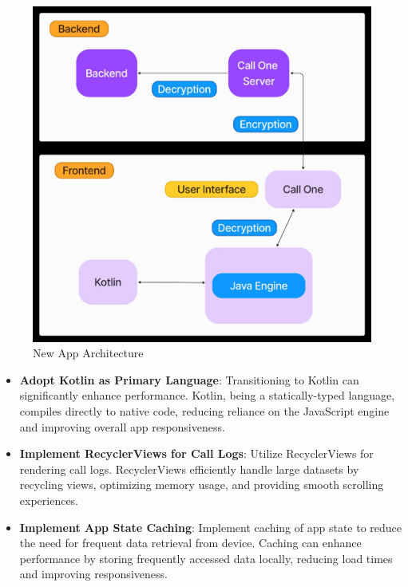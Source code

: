 \begin{figure}
    \centering
    \includegraphics[width=1\linewidth]{Media//Chapter 4//app_arch}
    \caption{New App Architecture}
    \label{fig:New App Architecture}
\end{figure}

\begin{itemize}
    \item \textbf{Adopt Kotlin as Primary Language}: Transitioning to Kotlin can significantly enhance performance.
    Kotlin, being a statically-typed language, compiles directly to native code, reducing reliance on the JavaScript engine and improving overall app responsiveness.

    \item \textbf{Implement RecyclerViews for Call Logs}: Utilize RecyclerViews for rendering call logs.
    RecyclerViews efficiently handle large datasets by recycling views, optimizing memory usage, and providing smooth scrolling experiences.

    \item \textbf{Implement App State Caching}: Implement caching of app state to reduce the need for frequent data retrieval from device.
    Caching can enhance performance by storing frequently accessed data locally, reducing load times and improving responsiveness.
\end{itemize}


